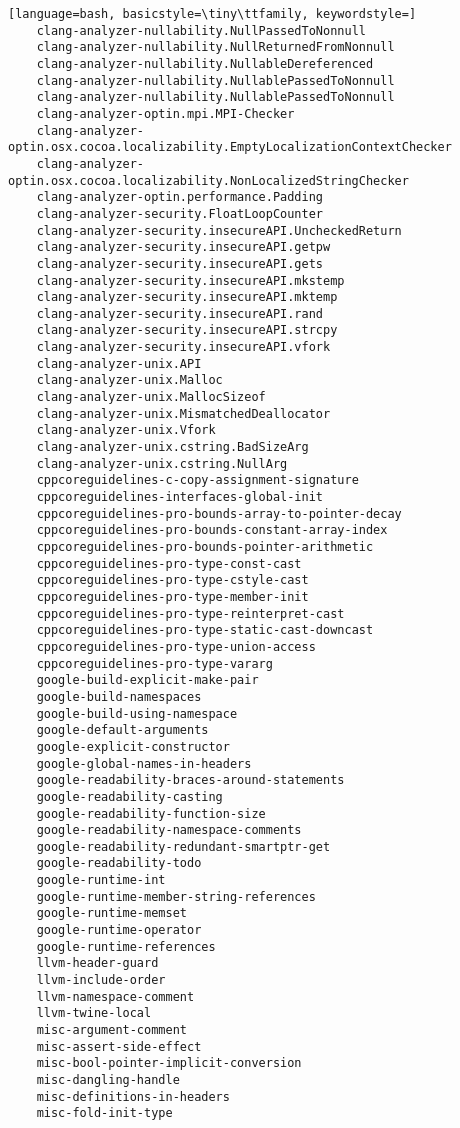 \documentclass[aspectratio=169]{beamer}
\begin{document}
\begin{lstlisting}[language=bash, basicstyle=\tiny\ttfamily, keywordstyle=]
    clang-analyzer-nullability.NullPassedToNonnull
    clang-analyzer-nullability.NullReturnedFromNonnull
    clang-analyzer-nullability.NullableDereferenced
    clang-analyzer-nullability.NullablePassedToNonnull
    clang-analyzer-nullability.NullablePassedToNonnull
    clang-analyzer-optin.mpi.MPI-Checker
    clang-analyzer-optin.osx.cocoa.localizability.EmptyLocalizationContextChecker
    clang-analyzer-optin.osx.cocoa.localizability.NonLocalizedStringChecker
    clang-analyzer-optin.performance.Padding
    clang-analyzer-security.FloatLoopCounter
    clang-analyzer-security.insecureAPI.UncheckedReturn
    clang-analyzer-security.insecureAPI.getpw
    clang-analyzer-security.insecureAPI.gets
    clang-analyzer-security.insecureAPI.mkstemp
    clang-analyzer-security.insecureAPI.mktemp
    clang-analyzer-security.insecureAPI.rand
    clang-analyzer-security.insecureAPI.strcpy
    clang-analyzer-security.insecureAPI.vfork
    clang-analyzer-unix.API
    clang-analyzer-unix.Malloc
    clang-analyzer-unix.MallocSizeof
    clang-analyzer-unix.MismatchedDeallocator
    clang-analyzer-unix.Vfork
    clang-analyzer-unix.cstring.BadSizeArg
    clang-analyzer-unix.cstring.NullArg
    cppcoreguidelines-c-copy-assignment-signature
    cppcoreguidelines-interfaces-global-init
    cppcoreguidelines-pro-bounds-array-to-pointer-decay
    cppcoreguidelines-pro-bounds-constant-array-index
    cppcoreguidelines-pro-bounds-pointer-arithmetic
    cppcoreguidelines-pro-type-const-cast
    cppcoreguidelines-pro-type-cstyle-cast
    cppcoreguidelines-pro-type-member-init
    cppcoreguidelines-pro-type-reinterpret-cast
    cppcoreguidelines-pro-type-static-cast-downcast
    cppcoreguidelines-pro-type-union-access
    cppcoreguidelines-pro-type-vararg
    google-build-explicit-make-pair
    google-build-namespaces
    google-build-using-namespace
    google-default-arguments
    google-explicit-constructor
    google-global-names-in-headers
    google-readability-braces-around-statements
    google-readability-casting
    google-readability-function-size
    google-readability-namespace-comments
    google-readability-redundant-smartptr-get
    google-readability-todo
    google-runtime-int
    google-runtime-member-string-references
    google-runtime-memset
    google-runtime-operator
    google-runtime-references
    llvm-header-guard
    llvm-include-order
    llvm-namespace-comment
    llvm-twine-local
    misc-argument-comment
    misc-assert-side-effect
    misc-bool-pointer-implicit-conversion
    misc-dangling-handle
    misc-definitions-in-headers
    misc-fold-init-type

\end{lstlisting}
\end{document}
